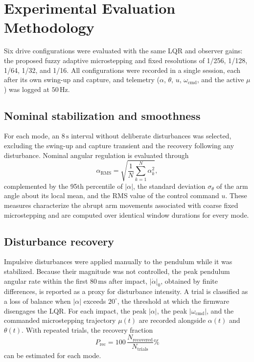 \documentclass[conference]{IEEEtran}
\begin{document}

\section{Experimental Evaluation Methodology}
Six drive configurations were evaluated with the same LQR and observer gains: the proposed fuzzy adaptive microstepping and fixed resolutions of 1/256, 1/128, 1/64, 1/32, and 1/16. All configurations were recorded in a single session, each after its own swing-up and capture, and telemetry ($\alpha$, $\theta$, $u$, $\omega_{\mathrm{cmd}}$, and the active $\mu$) was logged at $50\,\mathrm{Hz}$.

\subsection{Nominal stabilization and smoothness}
For each mode, an $8\,\mathrm{s}$ interval without deliberate disturbances was selected, excluding the swing-up and capture transient and the recovery following any disturbance. Nominal angular regulation is evaluated through
\begin{equation}
 \alpha_{\mathrm{RMS}}=\sqrt{\frac{1}{N}\sum_{k=1}^{N}\alpha_k^2},
 \label{eq:rms}
\end{equation}
complemented by the 95th percentile of $|\alpha|$, the standard deviation $\sigma_\theta$ of the arm angle about its local mean, and the RMS value of the control command $u$. These measures characterize the abrupt arm movements associated with coarse fixed microstepping and are computed over identical window durations for every mode.

\subsection{Disturbance recovery}
Impulsive disturbances were applied manually to the pendulum while it was stabilized. Because their magnitude was not controlled, the peak pendulum angular rate within the first $80\,\mathrm{ms}$ after impact, $|\dot\alpha|_0$, obtained by finite differences, is reported as a proxy for disturbance intensity. A trial is classified as a loss of balance when $|\alpha|$ exceeds $20^\circ$, the threshold at which the firmware disengages the LQR. For each impact, the peak $|\alpha|$, the peak $|\omega_{\mathrm{cmd}}|$, and the commanded microstepping trajectory $\mu(t)$ are recorded alongside $\alpha(t)$ and $\theta(t)$. With repeated trials, the recovery fraction
\begin{equation}
 P_{\mathrm{rec}}=100\,\frac{N_{\mathrm{recovered}}}{N_{\mathrm{trials}}}\%
 \label{eq:success}
\end{equation}
can be estimated for each mode.
\end{document}
